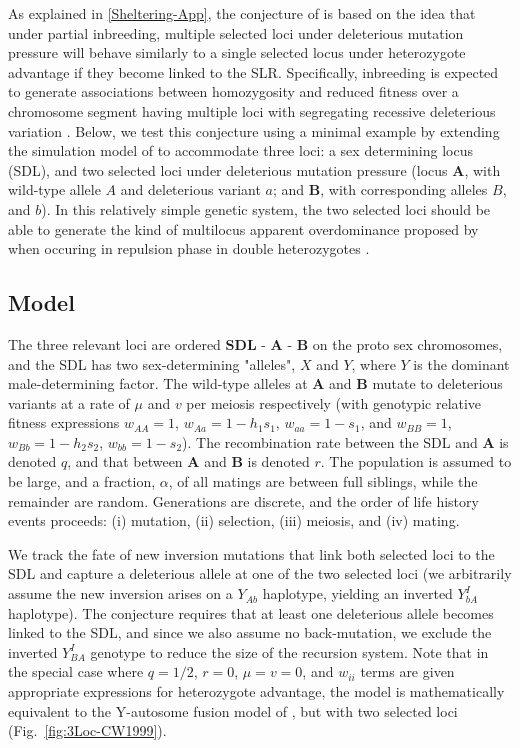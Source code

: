 \documentclass{article}
\def\mbf#1{\mathbf{#1}}
\begin{document}
\begin{appendices}
As explained in \ref{Sheltering-App}, the conjecture of \citet{CharlesworthWall1999} is based on the idea that under partial inbreeding, multiple selected loci under deleterious mutation pressure will behave similarly to a single selected locus under heterozygote advantage if they become linked to the SLR. Specifically, inbreeding is expected to generate associations between homozygosity and reduced fitness over a chromosome segment having multiple loci with segregating recessive deleterious variation \citep{Charlesworth1991b, Waller2021}. Below, we test this conjecture using a minimal example by extending the simulation model of \citet{CharlesworthWall1999} to accommodate three loci: a sex determining locus (SDL), and two selected loci under deleterious mutation pressure (locus $\mbf{A}$, with wild-type allele $A$ and deleterious variant $a$; and $\mbf{B}$, with corresponding alleles $B$, and $b$). In this relatively simple genetic system, the two selected loci should be able to generate the kind of multilocus apparent overdominance proposed by \citet{CharlesworthWall1999} when occuring in repulsion phase in double heterozygotes \citep{Charlesworth1991b, Waller2021}.


\subsection{Model} 

The three relevant loci are ordered $\mbf{SDL}$ - $\mbf{A}$ - $\mbf{B}$ on the proto sex chromosomes, and the SDL has two sex-determining "alleles", $X$ and $Y$, where $Y$ is the dominant male-determining factor. The wild-type alleles at $\mbf{A}$ and $\mbf{B}$ mutate to deleterious variants at a rate of $\mu$ and $v$ per meiosis respectively (with genotypic relative fitness expressions $w_{AA} = 1$, $w_{Aa} = 1 - h_1 s_1$, $w_{aa} = 1 - s_1$, and $w_{BB} = 1$, $w_{Bb} = 1 - h_2 s_2$, $w_{bb} = 1 - s_2$). The recombination rate between the SDL and $\mbf{A}$ is denoted $q$, and that between $\mbf{A}$ and $\mbf{B}$ is denoted $r$. The population is assumed to be large, and a fraction, $\alpha$, of all matings are between full siblings, while the remainder are random. Generations are discrete, and the order of life history events proceeds: (i) mutation, (ii) selection, (iii) meiosis, and (iv) mating. 

We track the fate of new inversion mutations  that link both selected loci to the SDL and capture a deleterious allele at one of the two selected loci (we arbitrarily assume the new inversion arises on a $Y_{Ab}$ haplotype, yielding an inverted $Y_{bA}^I$ haplotype). The conjecture requires that at least one deleterious allele becomes linked to the SDL, and since we also assume no back-mutation, we exclude the inverted $Y_{BA}^I$ genotype to reduce the size of the recursion system. Note that in the special case where $q = 1/2$, $r = 0$, $\mu = v = 0$, and $w_{ii}$ terms are given appropriate expressions for heterozygote advantage, the model is mathematically equivalent to the Y-autosome fusion model of \citet{CharlesworthWall1999}, but with two selected loci (Fig.~\ref{fig:3Loc-CW1999}).


\end{appendices}
\end{document}
